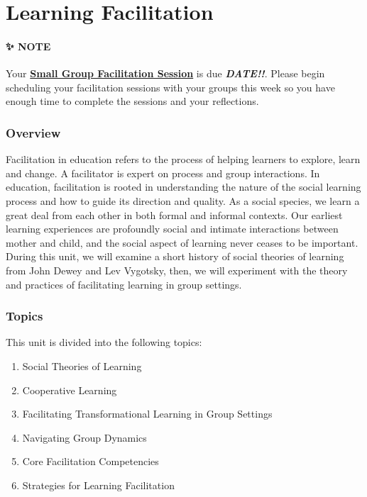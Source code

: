 \documentclass[
]{book}
\providecommand{\tightlist}{%
  \setlength{\itemsep}{0pt}\setlength{\parskip}{0pt}}
\begin{document}
\hypertarget{learning-facilitation}{%
\chapter{Learning Facilitation}\label{learning-facilitation}}

\begin{blank}
\hypertarget{note}{%
\subsubsection*{✨ NOTE}\label{note}}

Your \href{https://far.twu.ca/ldrs/663-202109/assignments}{\textbf{Small Group Facilitation Session}} is due {\textbf{\emph{DATE!!}}}. Please begin scheduling your facilitation sessions with your groups this week so you have enough time to complete the sessions and your reflections.
\end{blank}

\hypertarget{overview-1}{%
\subsection*{Overview}\label{overview-1}}

Facilitation in education refers to the process of helping learners to explore, learn and change. A facilitator is expert on process and group interactions. In education, facilitation is rooted in understanding the nature of the social learning process and how to guide its direction and quality. As a social species, we learn a great deal from each other in both formal and informal contexts. Our earliest learning experiences are profoundly social and intimate interactions between mother and child, and the social aspect of learning never ceases to be important. During this unit, we will examine a short history of social theories of learning from John Dewey and Lev Vygotsky, then, we will experiment with the theory and practices of facilitating learning in group settings.

\hypertarget{topics-1}{%
\subsection*{Topics}\label{topics-1}}

This unit is divided into the following topics:

\begin{enumerate}
\def\labelenumi{\arabic{enumi}.}
\tightlist
\item
  Social Theories of Learning
\item
  Cooperative Learning
\item
  Facilitating Transformational Learning in Group Settings
\item
  Navigating Group Dynamics
\item
  Core Facilitation Competencies
\item
  Strategies for Learning Facilitation
\end{enumerate}
\end{document}
